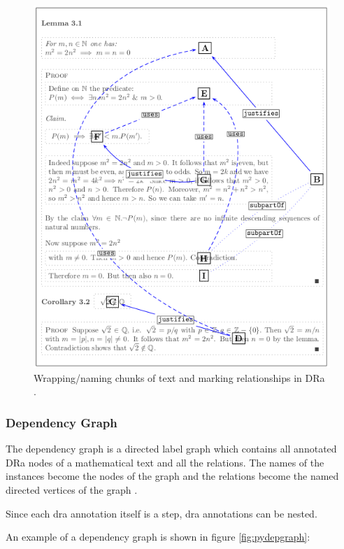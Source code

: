 \begin{figure}[H]
\begin{center}
\includegraphics[scale=0.8]{Figures/Background/dranotation.png}
\end{center}
\caption{Wrapping/naming chunks of text and marking relationships in DRa \cite{zengfirstyear}. \label{fig:draannotate}}
\end{figure}

\subsubsection{Dependency Graph}

The dependency graph is a directed label graph which contains all annotated DRa
nodes of a mathematical text and all the relations. The names of the instances
become the nodes of the graph and the relations become the named directed
vertices of the graph \cite{zengfirstyear}.

Since each \gls{dra} annotation itself is a step, \gls{dra} annotations can be
nested. 

An example of a dependency graph is shown in figure \ref{fig:pydepgraph}:

